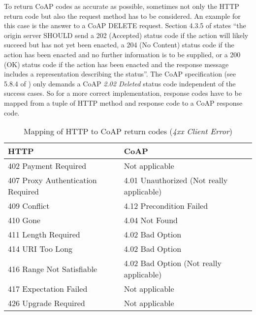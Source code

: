 	To return \ac{CoAP} codes as accurate as possible, sometimes not only the
	\ac{HTTP} return code but also the request method has to be considered. An
	example for this case is the answer to a \ac{CoAP} DELETE request. Section
	4.3.5 of \cite{http-1} states \enquote{the origin server SHOULD send a 202
	(Accepted) status code if the action will likely succeed but has not yet
	been enacted, a 204 (No Content) status code if the action has been enacted
	and no further information is to be supplied, or a 200 (OK) status code if
	the action has been enacted and the response message includes a
	representation describing the status}. The \ac{CoAP} specification (see
	5.8.4 of \cite{coap}) only demands a \ac{CoAP} \emph{2.02 Deleted} status
	code independent of the success cases. So for a more correct
	implementation, response codes have to be mapped from a tuple of \ac{HTTP}
	method and response code to a \ac{CoAP} response code.

	\begin{table}
		\begin{center}
			\begin{tabular}{l|l}
				\ac{HTTP}							& \ac{CoAP} \\
				\hline
				402 Payment Required				& \scriptsize{Not applicable} \\
				407 Proxy Authentication Required	& 4.01 Unauthorized \scriptsize{(Not really applicable)}\\
				409 Conflict						& 4.12 Precondition Failed \\
				410 Gone							& 4.04 Not Found \\
				411 Length Required					& 4.02 Bad Option \\
				414 URI Too Long					& 4.02 Bad Option \\
				416 Range Not Satisfiable			& 4.02 Bad Option \scriptsize{(Not really applicable)}\\
				417 Expectation Failed				& \scriptsize{Not applicable} \\
				426 Upgrade Required				& \scriptsize{Not applicable} \\
			\end{tabular}
		\end{center}
		\caption{Mapping of \ac{HTTP} to \ac{CoAP} return codes (\emph{4xx Client Error})}
		\label{table:mapping:codes:4xx}
	\end{table}

